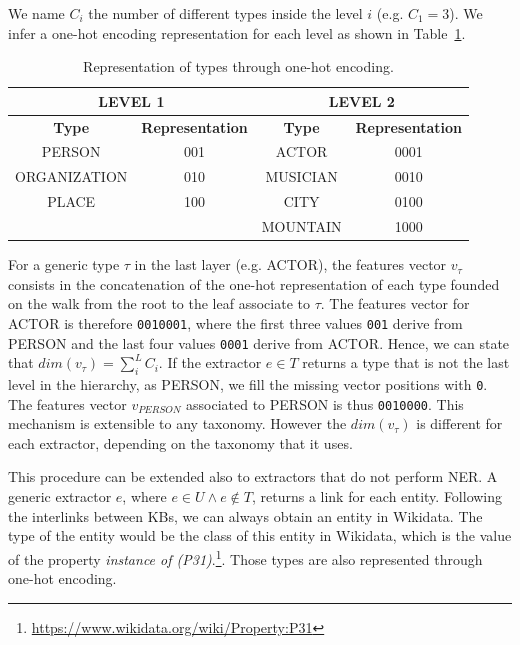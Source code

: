 \documentclass{llncs}
\newcommand{\tabref}[1]{\mbox{Table~\ref{#1}}}
\begin{document}
We name $C_i$ the number of different types inside the level $i$ (e.g. $C_1 = 3$). We infer a one-hot encoding representation for each level as shown in \tabref{tab:onehottype}.

\begin{table}
\centering
\label{tab:onehottype}
\begin{tabular}{|c|c|c|c|}
\hline
\multicolumn{2}{|c|}{\textbf{LEVEL 1}} & \multicolumn{2}{|c|}{\textbf{LEVEL 2}} \\ \hline
\textbf{Type}  & \textbf{Representation}  & \textbf{Type}  & \textbf{Representation}    \\ \hline
PERSON          & 001   & ACTOR     & 0001  \\ \hline
ORGANIZATION    & 010   & MUSICIAN  & 0010  \\ \hline
PLACE           & 100   & CITY      & 0100  \\ \hline
      &       & MOUNTAIN  & 1000  \\ \hline
\end{tabular}
\bigskip
\caption{Representation of types through one-hot encoding.}
\end{table}

For a generic type $\tau$ in the last layer (e.g. ACTOR), the features vector $v_{\tau}$ consists in the concatenation of the one-hot representation of each type founded on the walk from the root to the leaf associate to $\tau$. The features vector for ACTOR is therefore  \texttt{0010001}, where the first three values \texttt{001} derive from PERSON and the last four values \texttt{0001} derive from ACTOR. Hence, we can state that $dim(v_{\tau})= \sum_{i}^{L}C_i$. If the extractor $e \in T$ returns a type that is not the last level in the hierarchy, as PERSON, we fill the missing vector positions with \texttt{0}. The features vector $v_{PERSON}$ associated to PERSON is thus \texttt{0010000}. This mechanism is extensible to any taxonomy. However the $dim(v_{\tau})$ is different for each extractor, depending on the taxonomy that it uses. 

This procedure can be extended also to extractors that do not perform NER. A generic extractor $e$, where $e \in U \wedge e \not\in T$, returns a link for each entity. Following the interlinks between KBs, we can always obtain an entity in Wikidata. The type of the entity would be the class of this entity in Wikidata, which is the value of the property \textit{instance of (P31)}.\footnote{\label{P31} \url{https://www.wikidata.org/wiki/Property:P31}}. Those types are also represented through one-hot encoding.
\end{document}
